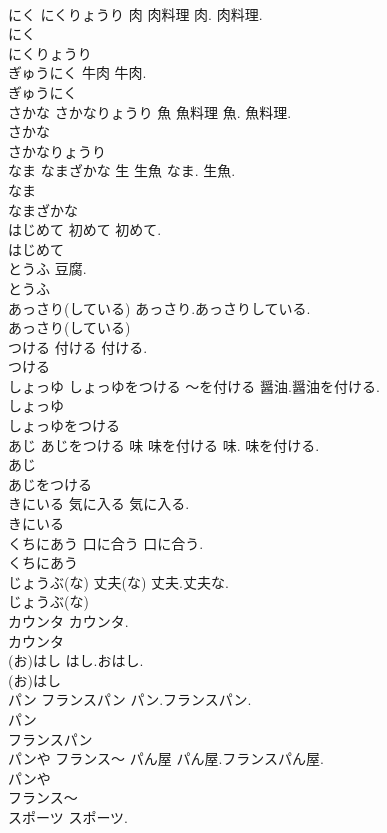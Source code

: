 \documentclass[8pt]{extreport}
\begin{document}
\begin{CJK}{UTF8}{min}
\\	にく にくりょうり	肉 肉料理	肉. 肉料理.	
\\	にく
\\	にくりょうり
\\	ぎゅうにく	牛肉	牛肉.	
\\	ぎゅうにく
\\	さかな さかなりょうり	魚 魚料理	魚. 魚料理.	
\\	さかな
\\	さかなりょうり
\\	なま なまざかな	生 生魚	なま. 生魚.	
\\	なま
\\	なまざかな
\\	はじめて	初めて	初めて.	
\\	はじめて
\\	とうふ		豆腐.	
\\	とうふ
\\	あっさり(している)		あっさり.あっさりしている.	
\\	あっさり(している)
\\	つける	付ける	付ける.	
\\	つける
\\	しょっゆ しょっゆをつける	～を付ける	醤油.醤油を付ける.	
\\	しょっゆ
\\	しょっゆをつける
\\	あじ あじをつける	味 味を付ける	味. 味を付ける.	
\\	あじ
\\	あじをつける
\\	きにいる	気に入る	気に入る.	
\\	きにいる
\\	くちにあう	口に合う	口に合う.	
\\	くちにあう
\\	じょうぶ(な)	丈夫(な)	丈夫.丈夫な.	
\\	じょうぶ(な)
\\	カウンタ		カウンタ.	
\\	カウンタ
\\	(お)はし		はし.おはし.	
\\	(お)はし
\\	パン フランスパン		パン.フランスパン.	
\\	パン
\\	フランスパン
\\	パンや フランス～	パん屋	パん屋.フランスパん屋.	
\\	パンや
\\	フランス～
\\	スポーツ		スポーツ.	

\end{CJK}
\end{document}
